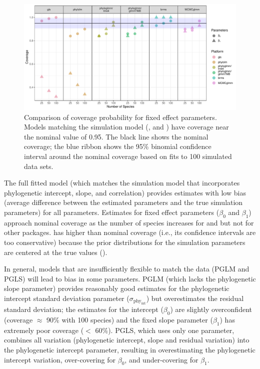 \documentclass[12pt]{article}
\begin{document}
\begin{center}
\begin{figure}[H]
  \includegraphics[scale=0.7]{./figure/sscoverage.pdf}
  \caption{Comparison of coverage probability for fixed effect parameters. Models matching the simulation model (\pkg{\plmefour}, \pkg{\pgTMB} and ) have coverage near the nominal value of 0.95. The black line shows the nominal coverage; the blue ribbon shows the 95\% binomial confidence interval around the nominal coverage based on fits to 100 simulated data sets.
  }
\label{ssplot_coverage}
\end{figure}
\end{center}

The full fitted model (which matches the simulation model that incorporates phylogenetic intercept, slope, and correlation) provides estimates with low bias (average difference between the estimated parameters and the true simulation parameters) for all parameters. 
Estimates for fixed effect parameters ($\beta_0$ and $\beta_1$) approach nominal coverage as the number of species increases for  and  but not for other packages.  has higher than nominal coverage (i.e., its confidence intervals are too conservative) because the prior distributions for the simulation parameters are centered at the true values (\citet{li2018fitting}).

In general, models that are insufficiently flexible to match the data (PGLM and PGLS) will lead to bias in some parameters.
PGLM (which lacks the phylogenetic slope parameter) provides reasonably good estimates for the phylogenetic intercept standard deviation parameter ($\sigma_{\mathrm{phy_{int}}}$) but overestimates the residual standard deviation; the estimates for the intercept ($\beta_0$) are slightly overconfident (coverage $\approx$ 90\% with 100 species) and the fixed slope parameter ($\beta_1$) has extremely poor coverage ($<$ 60\%).
PGLS, which uses only one parameter, combines all variation (phylogenetic intercept, slope and residual variation) into the phylogenetic intercept parameter, resulting in overestimating the phylogenetic intercept variation, over-covering for $\beta_0$, and under-covering for $\beta_1$.
\end{document}

